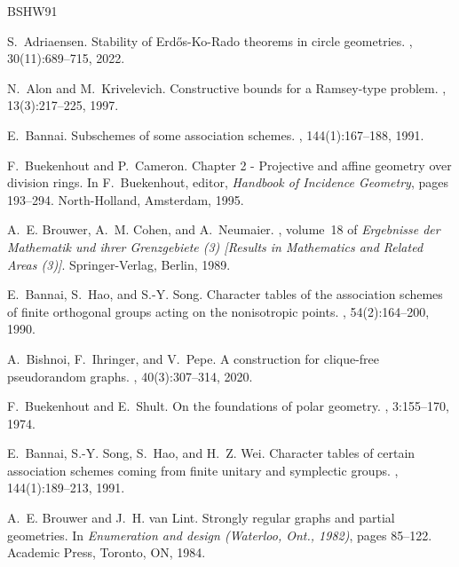 \documentclass[a4paper]{article}
\theoremstyle{definition}
\begin{document}
\begin{thebibliography}{BSHW91}

S.~Adriaensen.
\newblock Stability of {E}rd{\H o}s-{K}o-{R}ado theorems in circle geometries.
, 30(11):689--715, 2022.

N.~Alon and M.~Krivelevich.
\newblock Constructive bounds for a {R}amsey-type problem.
, 13(3):217--225, 1997.

E.~Bannai.
\newblock Subschemes of some association schemes.
, 144(1):167--188, 1991.

F.~Buekenhout and P.~Cameron.
\newblock Chapter 2 - {P}rojective and affine geometry over division rings.
\newblock In F.~Buekenhout, editor, {\em Handbook of Incidence Geometry}, pages
  193--294. North-Holland, Amsterdam, 1995.

A.~E. Brouwer, A.~M. Cohen, and A.~Neumaier.
, volume~18 of {\em Ergebnisse der
  Mathematik und ihrer Grenzgebiete (3) [Results in Mathematics and Related
  Areas (3)]}.
\newblock Springer-Verlag, Berlin, 1989.

E.~Bannai, S.~Hao, and S.-Y. Song.
\newblock Character tables of the association schemes of finite orthogonal
  groups acting on the nonisotropic points.
, 54(2):164--200, 1990.

A.~Bishnoi, F.~Ihringer, and V.~Pepe.
\newblock A construction for clique-free pseudorandom graphs.
, 40(3):307--314, 2020.

F.~Buekenhout and E.~Shult.
\newblock On the foundations of polar geometry.
, 3:155--170, 1974.

E.~Bannai, S.-Y. Song, S.~Hao, and H.~Z. Wei.
\newblock Character tables of certain association schemes coming from finite
  unitary and symplectic groups.
, 144(1):189--213, 1991.

A.~E. Brouwer and J.~H. van Lint.
\newblock Strongly regular graphs and partial geometries.
\newblock In {\em Enumeration and design ({W}aterloo, {O}nt., 1982)}, pages
  85--122. Academic Press, Toronto, ON, 1984.


\end{thebibliography}
\end{document}
